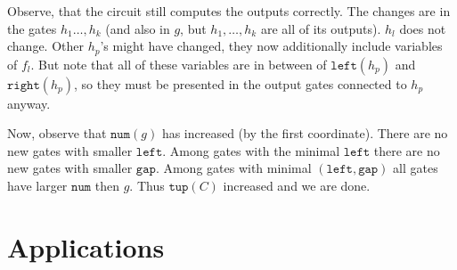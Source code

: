 \documentclass[11pt,letterpaper]{article}
\newcommand{\lef}{\texttt{left}}
\newcommand{\righ}{\texttt{right}}
\newcommand{\gap}{\texttt{gap}}
\newcommand{\num}{\texttt{num}}
\newcommand{\tup}{\texttt{tup}}
\begin{document}
Observe, that the circuit still computes the outputs correctly. The changes are in the gates $h_1\ldots, h_k$ (and also in $g$, but $h_1,\ldots, h_k$ are all of its outputs). $h_l$ does not change. Other $h_p$'s might have changed, they now additionally include variables of $f_l$. But note that all of these variables are in between of $\lef(h_p)$ and $\righ(h_p)$, so they must be presented in the output gates connected to $h_p$ anyway.

Now, observe that $\num(g)$ has increased (by the first coordinate). There are no new gates with smaller $\lef$. Among gates with the minimal $\lef$ there are no new gates with smaller $\gap$. Among gates with minimal $(\lef,\gap)$ all gates have larger $\num$ then $g$. Thus $\tup(C)$ increased and we are done.

\section{Applications}



\end{document}
